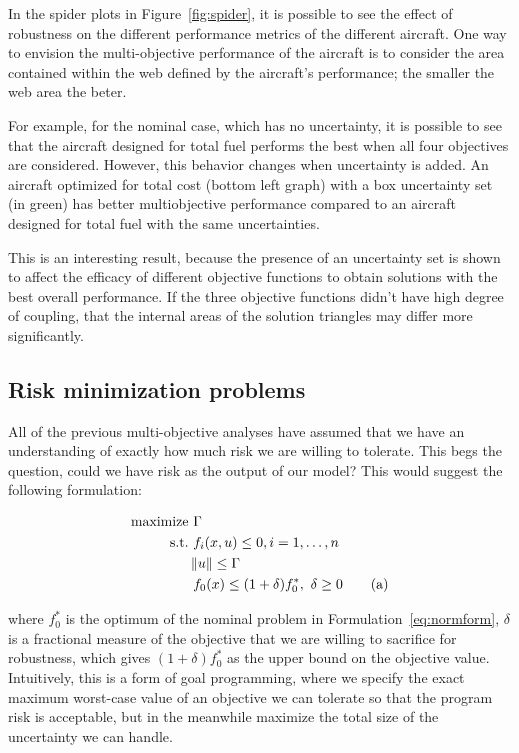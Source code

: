 In the spider plots in Figure~\ref{fig:spider}, it is possible to see the effect of robustness on
the different performance metrics of the different aircraft. One way to envision the multi-objective
performance of the aircraft is to consider the area contained within the web defined by the aircraft's
performance; the smaller the web area the beter.

For example, for the nominal case, which has no uncertainty, it is possible to see that
the aircraft designed for total fuel performs the best when all four objectives are considered.
However, this behavior changes when uncertainty is added. An aircraft optimized for total cost
(bottom left graph) with a box uncertainty set (in green) has better multiobjective performance
compared to an aircraft designed for total fuel with the same uncertainties.

This is an interesting result, because the presence of an uncertainty set is
shown to affect the efficacy of different objective functions to obtain solutions
with the best overall performance. If the three objective functions didn't
have high degree of coupling, that the internal areas of the solution triangles may differ
more significantly.

\subsection{Risk minimization problems}

All of the previous multi-objective analyses have assumed that we have an
understanding of exactly how much risk we are
willing to tolerate. This begs the question, could we have risk as the output of our
model? This would suggest the following formulation:

\begin{align*}
    \text{maximize} &~\Gamma \\
    \text{s.t.}     &~f_i(x,u) \leq 0, i = 1,\ldots,n \\
                    & \left\lVert u\right\rVert \leq \Gamma \\
                    &~f_0(x) \leq (1+\delta)f_0^*,~\delta \geq 0 \tag{a}
    \label{eq:goalprogramming}
\end{align*}

where $f_0^*$ is the optimum of the nominal problem in Formulation~\ref{eq:normform}, $\delta$
is a fractional measure of the objective that we are willing to sacrifice for robustness, which
gives $(1+\delta)f_0^*$ as the upper bound on the objective value. Intuitively,
this is a form of goal programming,
where we specify the exact maximum worst-case value of an objective we can tolerate so that the program
risk is acceptable, but in the meanwhile maximize the total size of the uncertainty we can handle.


